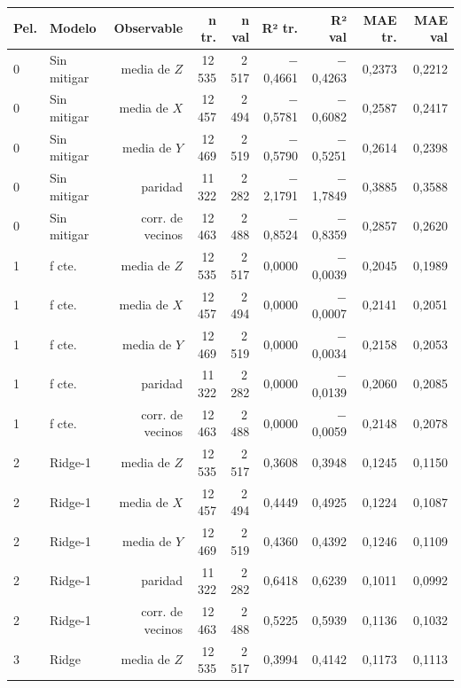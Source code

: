 \begin{table}[htbp]
    \centering
    {\footnotesize
    \begin{tabular}{@{}llrrrrrrr@{}}
        \toprule
        \textbf{Pel.} & \textbf{Modelo} & \textbf{Observable} & \textbf{n tr.} & \textbf{n val} & \textbf{R² tr.} & \textbf{R² val} & \textbf{MAE tr.} & \textbf{MAE val} \\
        \midrule
        0 & Sin mitigar & media de $Z$ & 12\,535 & 2\,517 & $-$0,4661 & $-$0,4263 & 0,2373 & 0,2212 \\
        0 & Sin mitigar & media de $X$ & 12\,457 & 2\,494 & $-$0,5781 & $-$0,6082 & 0,2587 & 0,2417 \\
        0 & Sin mitigar & media de $Y$ & 12\,469 & 2\,519 & $-$0,5790 & $-$0,5251 & 0,2614 & 0,2398 \\
        0 & Sin mitigar & paridad & 11\,322 & 2\,282 & $-$2,1791 & $-$1,7849 & 0,3885 & 0,3588 \\
        0 & Sin mitigar & corr. de vecinos & 12\,463 & 2\,488 & $-$0,8524 & $-$0,8359 & 0,2857 & 0,2620 \\
        1 & f cte. & media de $Z$ & 12\,535 & 2\,517 & 0,0000 & $-$0,0039 & 0,2045 & 0,1989 \\
        1 & f cte. & media de $X$ & 12\,457 & 2\,494 & 0,0000 & $-$0,0007 & 0,2141 & 0,2051 \\
        1 & f cte. & media de $Y$ & 12\,469 & 2\,519 & 0,0000 & $-$0,0034 & 0,2158 & 0,2053 \\
        1 & f cte. & paridad & 11\,322 & 2\,282 & 0,0000 & $-$0,0139 & 0,2060 & 0,2085 \\
        1 & f cte. & corr. de vecinos & 12\,463 & 2\,488 & 0,0000 & $-$0,0059 & 0,2148 & 0,2078 \\
        2 & Ridge-1 & media de $Z$ & 12\,535 & 2\,517 & 0,3608 & 0,3948 & 0,1245 & 0,1150 \\
        2 & Ridge-1 & media de $X$ & 12\,457 & 2\,494 & 0,4449 & 0,4925 & 0,1224 & 0,1087 \\
        2 & Ridge-1 & media de $Y$ & 12\,469 & 2\,519 & 0,4360 & 0,4392 & 0,1246 & 0,1109 \\
        2 & Ridge-1 & paridad & 11\,322 & 2\,282 & 0,6418 & 0,6239 & 0,1011 & 0,0992 \\
        2 & Ridge-1 & corr. de vecinos & 12\,463 & 2\,488 & 0,5225 & 0,5939 & 0,1136 & 0,1032 \\
        3 & Ridge & media de $Z$ & 12\,535 & 2\,517 & 0,3994 & 0,4142 & 0,1173 & 0,1113 \\

\end{tabular}}
\end{table}
